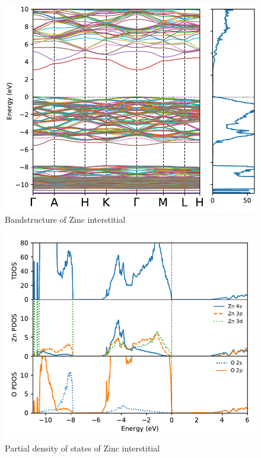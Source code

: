\begin{figure}[tbh!]
	\centering
	\includegraphics[width=0.6\linewidth]{"images/rnd/band-dos_Zn_i"}
	\caption[Bandstructure of Zinc interstitial]{Bandstructure of Zinc interstitial}
	\label{fig:band-dos_Zn_i}
\end{figure}

\begin{figure}[tbh!]
	\centering
	\includegraphics[width=0.6\linewidth]{"images/rnd/dos-pdos_Zn_i"}
	\caption[Partial density of states of Zinc interstitial]{Partial density of states of Zinc interstitial}
	\label{fig:dos-pdos_Zn_i}
\end{figure}


